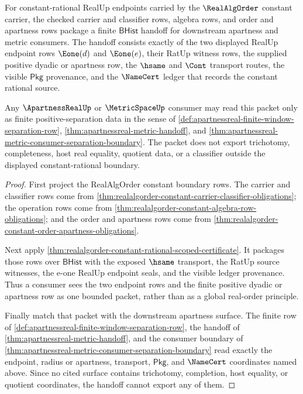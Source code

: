 \begin{theorem}
\label{thm:realalgorder-constant-apartness-metric-handoff}
For constant-rational RealUp endpoints carried by the $\RealAlgOrder$
constant carrier, the checked carrier and classifier rows, algebra rows, and
order and apartness rows package a finite $\mathsf{BHist}$ handoff for
downstream apartness and metric consumers. The handoff consists exactly of the
two displayed RealUp endpoint rows $\Eone(d)$ and $\Eone(e)$, their RatUp
witness rows, the supplied positive dyadic or apartness row, the $\hsame$ and
$\Cont$ transport routes, the visible $\mathsf{Pkg}$ provenance, and the
$\NameCert$ ledger that records the constant rational source.

Any $\ApartnessRealUp$ or $\MetricSpaceUp$ consumer may read this packet only
as finite positive-separation data in the sense of
\autoref{def:apartnessreal-finite-window-separation-row},
\autoref{thm:apartnessreal-metric-handoff}, and
\autoref{thm:apartnessreal-metric-consumer-separation-boundary}. The packet
does not export trichotomy, completeness, host real equality, quotient data,
or a classifier outside the displayed constant-rational boundary.
\end{theorem}
\begin{proof}
First project the RealAlgOrder constant boundary rows. The carrier and
classifier rows come from
\autoref{thm:realalgorder-constant-carrier-classifier-obligations}; the
operation rows come from
\autoref{thm:realalgorder-constant-algebra-row-obligations}; and the order and
apartness rows come from
\autoref{thm:realalgorder-constant-order-apartness-obligations}.

Next apply
\autoref{thm:realalgorder-constant-rational-scoped-certificate}. It packages
those rows over $\mathsf{BHist}$ with the exposed $\hsame$ transport, the
RatUp source witnesses, the e-one RealUp endpoint seals, and the visible
ledger provenance. Thus a consumer sees the two endpoint rows and the finite
positive dyadic or apartness row as one bounded packet, rather than as a
global real-order principle.

Finally match that packet with the downstream apartness surface. The finite
row of \autoref{def:apartnessreal-finite-window-separation-row}, the handoff
of \autoref{thm:apartnessreal-metric-handoff}, and the consumer boundary of
\autoref{thm:apartnessreal-metric-consumer-separation-boundary} read exactly
the endpoint, radius or apartness, transport, $\mathsf{Pkg}$, and $\NameCert$
coordinates named above. Since no cited surface contains trichotomy,
completion, host equality, or quotient coordinates, the handoff cannot export
any of them.
\end{proof}

